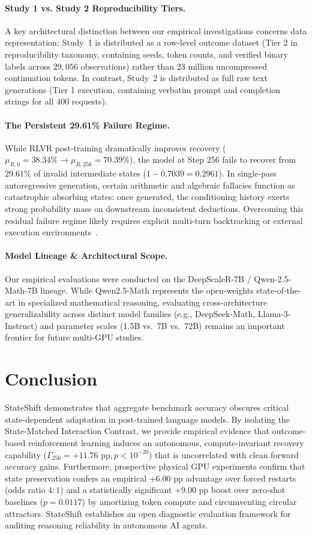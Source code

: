 \documentclass[11pt]{article}
\begin{document}
\paragraph{Study 1 vs. Study 2 Reproducibility Tiers.}
A key architectural distinction between our empirical investigations concerns data representation: Study~1 is distributed as a row-level outcome dataset (Tier 2 in reproducibility taxonomy, containing seeds, token counts, and verified binary labels across $29,056$ observations) rather than 23 million uncompressed continuation tokens. In contrast, Study~2 is distributed as full raw text generations (Tier 1 execution, containing verbatim prompt and completion strings for all 400 requests).

\paragraph{The Persistent 29.61\% Failure Regime.}
While RLVR post-training dramatically improves recovery ($\mu_{R,0}=38.34\% \to \mu_{R,256}=70.39\%$), the model at Step 256 fails to recover from $29.61\%$ of invalid intermediate states ($1 - 0.7039 = 0.2961$). In single-pass autoregressive generation, certain arithmetic and algebraic fallacies function as catastrophic absorbing states: once generated, the conditioning history exerts strong probability mass on downstream inconsistent deductions. Overcoming this residual failure regime likely requires explicit multi-turn backtracking or external execution environments~\cite{Kumar2024Training}.

\paragraph{Model Lineage \& Architectural Scope.}
Our empirical evaluations were conducted on the DeepScaleR-7B / Qwen-2.5-Math-7B lineage. While Qwen2.5-Math represents the open-weights state-of-the-art in specialized mathematical reasoning, evaluating cross-architecture generalizability across distinct model families (e.g., DeepSeek-Math, Llama-3-Instruct) and parameter scales (1.5B vs.\ 7B vs.\ 72B) remains an important frontier for future multi-GPU studies.

\section{Conclusion}
StateShift demonstrates that aggregate benchmark accuracy obscures critical state-dependent adaptation in post-trained language models. By isolating the State-Matched Interaction Contrast, we provide empirical evidence that outcome-based reinforcement learning induces an autonomous, compute-invariant recovery capability ($\Gamma_{256} = +11.76\text{ pp}, p < 10^{-20}$) that is uncorrelated with clean forward accuracy gains. Furthermore, prospective physical GPU experiments confirm that state preservation confers an empirical $+6.00\text{ pp}$ advantage over forced restarts (odds ratio $4:1$) and a statistically significant $+9.00\text{ pp}$ boost over zero-shot baselines ($p = 0.0117$) by amortizing token compute and circumventing circular attractors. StateShift establishes an open diagnostic evaluation framework for auditing reasoning reliability in autonomous AI agents.



\end{document}
